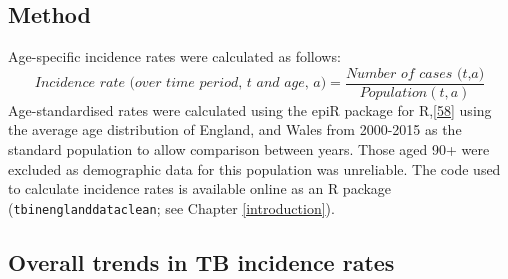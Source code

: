 \documentclass[11pt,twoside]{bristolthesis}
\begin{document}
  \hypertarget{method-1}{%
  \subsection{Method}\label{method-1}}
  
  Age-specific incidence rates were calculated as follows:
  \begin{equation} 
    \textit{Incidence rate (over time period, t and age, a)} = \frac{\textit{Number of cases (t,a)}}{Population(t, a)}
    \label{eq:incEq}
  \end{equation}
  Age-standardised rates were calculated using the epiR package for R,{[}\protect\hyperlink{ref-Stevenson2016}{58}{]} using the average age distribution of England, and Wales from 2000-2015 as the standard population to allow comparison between years. Those aged 90+ were excluded as demographic data for this population was unreliable. The code used to calculate incidence rates is available online as an R package (\texttt{tbinenglanddataclean}; see Chapter \ref{introduction}).
  
  \hypertarget{overall-trends-in-tb-incidence-rates}{%
  \subsection{Overall trends in TB incidence rates}\label{overall-trends-in-tb-incidence-rates}}
  
\end{document}
